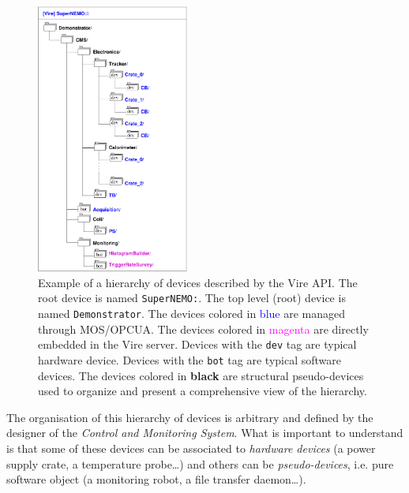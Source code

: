 \begin{figure}[h]
\begin{center}
\includegraphics[width=5cm]{appendix/images/MOS_device_example_2.pdf}
\end{center}
\caption{Example of a hierarchy of  devices described by the Vire API.
  The root device is named  \texttt{SuperNEMO:}.  The top level (root)
  device  is  named  \texttt{Demonstrator}.  The  devices  colored  in
  \textcolor{blue}{blue}  are managed  through MOS/OPCUA.  The devices
  colored in \textcolor{magenta}{magenta} are directly embedded in the
  Vire server.  Devices with the \texttt{dev} tag are typical hardware
  device.  Devices  with the  \texttt{bot}  tag  are typical  software
  devices.   The  devices  colored in  \textbf{black}  are  structural
  pseudo-devices used to organize and  present a comprehensive view of
  the hierarchy. }\label{fig:an:mos_dev_2}
\end{figure}

The organisation of this hierarchy of devices is arbitrary and defined
by the designer of the  \emph{Control and Monitoring System}.  What is
important  to  understand  is  that  some  of  these  devices  can  be
associated  to  \emph{hardware  devices}  (a  power  supply  crate,  a
temperature probe\dots) and others  can be \emph{pseudo-devices}, i.e.
pure   software  object   (a   monitoring  robot,   a  file   transfer
daemon\dots).

